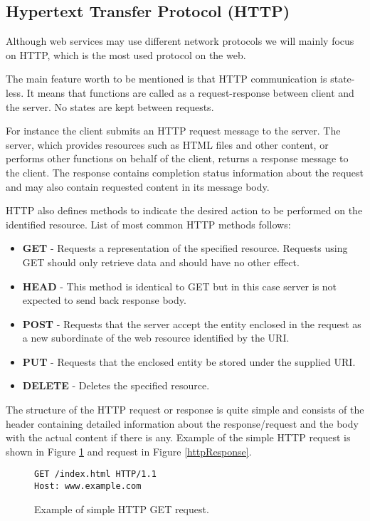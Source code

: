 \documentclass[thesis=M,english]{FITthesis}[2012/10/20]
\begin{document}
\subsection{Hypertext Transfer Protocol (HTTP)}
Although web services may use different network protocols we will mainly focus on HTTP, which is the most used protocol on the web. 

The main feature worth to be mentioned is that HTTP communication is state-less. It means that functions are called as a request-response between client and the server. No states are kept between requests.

For instance the client submits an HTTP request message to the server. The server, which provides resources such as HTML files and other content, or performs other functions on behalf of the client, returns a response message to the client. The response contains completion status information about the request and may also contain requested content in its message body.

HTTP also defines methods to indicate the desired action to be performed on the identified resource. List of most common HTTP methods follows\cite{http}:

\begin{itemize}
\item \textbf{GET} - Requests a representation of the specified resource. Requests using GET should only retrieve data and should have no other effect.
\item \textbf{HEAD} - This method is identical to GET but in this case server is not expected to send back response body.
\item \textbf{POST} - Requests that the server accept the entity enclosed in the request as a new subordinate of the web resource identified by the URI.
\item \textbf{PUT} - Requests that the enclosed entity be stored under the supplied URI.
\item \textbf{DELETE} - Deletes the specified resource.
\end{itemize}

The structure of the HTTP request or response is quite simple and consists of the header containing detailed information about the response/request and the body with the actual content if there is any. Example of the simple HTTP request is shown in Figure \ref{httpGet} and request in Figure \ref{httpResponse}.

\lstset{ 
  language=HTML,
}

\begin{figure}
\begin{lstlisting}
GET /index.html HTTP/1.1
Host: www.example.com
\end{lstlisting}
\caption{Example of simple HTTP GET request.}
\label{httpGet}
\end{figure}
\end{document}
